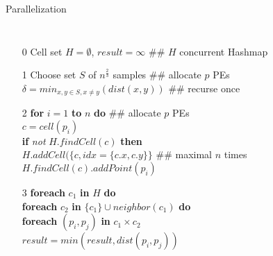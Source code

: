 \documentclass[18pt]{beamer}
\begin{document}
\setlength{\columnsep}{-10cm}
\begin{frame}{Parallelization}
\begin{columns}

\small
\begin{itemize}\itemsep0pt
\item[\footnotesize 0] Cell set $H = \emptyset$, $result = \infty$ \alert{\#\# $H$ concurrent Hashmap} \\
						
\vspace{8pt}
\item[\footnotesize 1] 
Choose set $S$ of $n^{\frac{2}{3}}$ samples \alert{\#\# allocate $p$ PEs}\\
						$\delta = min_{x,y \in S, x \neq y}(dist(x, y))$ \alert{\#\# recurse once}\\
\item[\footnotesize 2] \textbf{for} $i = 1$ \textbf{to} $n$ \textbf{do} \alert{\#\# allocate $p$ PEs} \\
						\hspace{2em}$c = cell(p_i)$ \\
						\hspace{2em}\textbf{if} \textit{not} $H.findCell(c)$ \textbf{then} \\
						\hspace{4em}$H.addCell(\{c, idx = \{c.x, c.y\}\}$ \alert{\#\# maximal $n$ times}\\								\hspace{2em}$H.findCell(c).addPoint(p_i)$ \\
\item[\footnotesize 3] %
						\textbf{foreach} $c_1$ \textbf{in} $H$ \textbf{do} \\
						\hspace{2em} \textbf{foreach} $c_2$ \textbf{in} $\{c_1\} \cup neighbor(c_1)$ \textbf{do} \\
						\hspace{4em} \textbf{foreach} $(p_i,p_j)$ \textbf{in} $c_1 \times c_2$ \\%
						\hspace{6em} $result = min(result, dist(p_i, p_j))$
\end{itemize}


\end{columns}
\end{frame}
\end{document}
